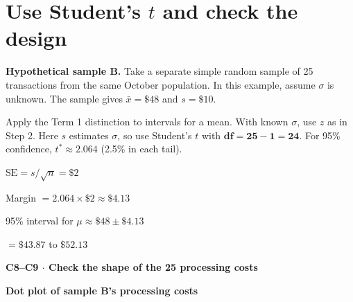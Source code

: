 
\clearpage
\section{Use Student's \texorpdfstring{\(t\)}{t} and check the design}

\textbf{Hypothetical sample B.} Take a separate simple random sample of 25 transactions from the same October population. In this example, assume \(\sigma\) is unknown. The sample gives \(\bar{x}=\$48\) and \(s=\$10\).

Apply the Term 1 distinction to intervals for a mean. With known \(\sigma\), use \(z\) as in Step 2. Here \(s\) estimates \(\sigma\), so use Student's \(t\) with \(\boldsymbol{df=25-1=24}\). For 95\% confidence, \(t^*\approx 2.064\) (2.5\% in each tail).

\noindent
\begin{minipage}[c]{0.39\linewidth}
  \(\mathrm{SE}=s/\sqrt{n}=\$2\)\par
  Margin \(=2.064\times \$2\approx \$4.13\)\par
  95\% interval for \(\mu\approx \$48\pm \$4.13\)\par
  \(=\$43.87\) to \(\$52.13\)
\end{minipage}\hfill
\begin{minipage}[c]{0.57\linewidth}
  \centering
  \small\textbf{C8--C9 \(\cdot\) Check the shape of the 25 processing costs}\par\smallskip
  \small\textbf{Dot plot of sample B's processing costs}\par\smallskip
\end{minipage}

